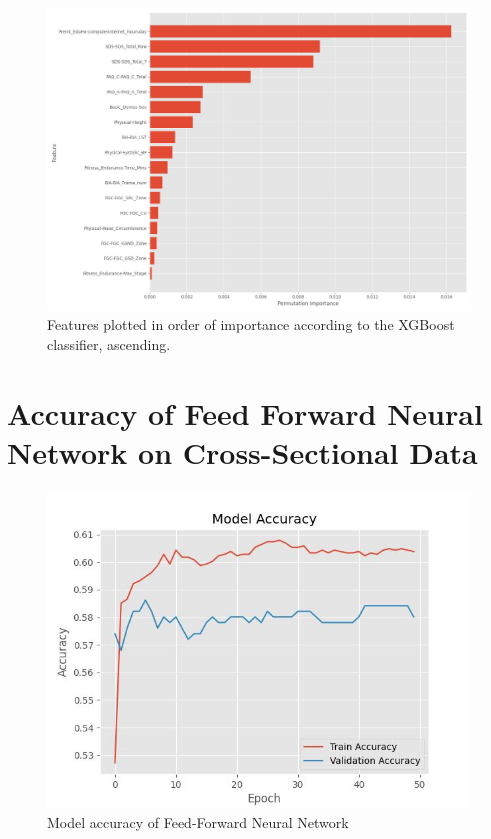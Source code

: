 \begin{appendices}
    \begin{figure}[h!]
        \centering
        \includegraphics[scale=0.4]{"./images/feature_importance.jpg"}
        \caption{Features plotted in order of importance according to the XGBoost classifier, ascending.}
      \end{figure}

      \section{Accuracy of Feed Forward Neural Network on Cross-Sectional Data}
      \begin{figure}[h!]
        \centering
        \includegraphics[scale=0.8]{"./images/model_accuracy.jpg"}
        \caption{Model accuracy of Feed-Forward Neural Network}
    \end{figure}


\end{appendices}
